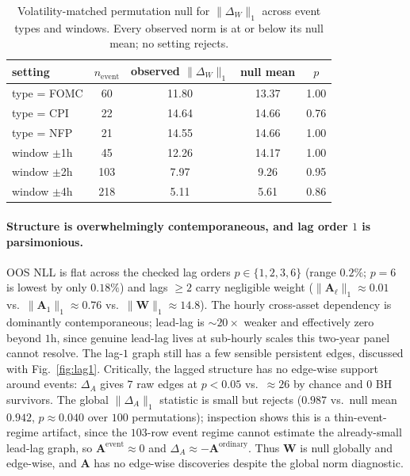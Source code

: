 \documentclass{article}
\newcommand{\W}{\bm{W}}
\newcommand{\A}{\bm{A}}
\newcommand{\Wd}{\Delta_{\!W}}
\newcommand{\Ad}{\Delta_{\!A}}
\begin{document}
\begin{table}[t]
\centering
\small
\begin{tabular}{lcccc}
\toprule
setting & $n_{\text{event}}$ & observed $\|\Wd\|_1$ & null mean & $p$\\
\midrule
type = FOMC   & 60  & 11.80 & 13.37 & 1.00\\
type = CPI    & 22  & 14.64 & 14.66 & 0.76\\
type = NFP    & 21  & 14.55 & 14.66 & 1.00\\
window $\pm$1h & 45  & 12.26 & 14.17 & 1.00\\
window $\pm$2h & 103 & \phantom{0}7.97 & \phantom{0}9.26 & 0.95\\
window $\pm$4h & 218 & \phantom{0}5.11 & \phantom{0}5.61 & 0.86\\
\bottomrule
\end{tabular}
\caption{Volatility-matched permutation null for $\|\Wd\|_1$ across event types and
windows. Every observed norm is at or below its null mean; no setting rejects.}
\label{tab:nulls}
\end{table}

\paragraph{Structure is overwhelmingly contemporaneous, and lag order $1$ is parsimonious.}
OOS NLL is flat across the checked lag orders $p\in\{1,2,3,6\}$ (range $0.2\%$; $p=6$
is lowest by only $0.18\%$) and lags $\ge 2$ carry negligible weight
($\|\A_\ell\|_1\approx 0.01$ vs.\ $\|\A_1\|_1\approx 0.76$
vs.\ $\|\W\|_1\approx 14.8$). The hourly cross-asset dependency is dominantly
contemporaneous; lead-lag is $\sim 20\times$ weaker and effectively zero beyond
$1$h, since genuine lead-lag lives at sub-hourly scales this two-year panel cannot
resolve. The lag-$1$ graph still has a few sensible persistent edges, discussed with
Fig.~\ref{fig:lag1}. Critically, the lagged structure has no edge-wise support around
events: $\Ad$ gives $7$ raw edges at $p<0.05$ vs.\ $\approx 26$ by chance and $0$ BH
survivors. The global $\|\Ad\|_1$ statistic is small but rejects
($0.987$ vs.\ null mean $0.942$, $p\approx0.040$ over $100$ permutations); inspection
shows this is a thin-event-regime artifact, since the $103$-row event regime cannot
estimate the already-small lead-lag graph, so $\A^{\text{event}}\approx 0$ and
$\Ad\approx-\A^{\text{ordinary}}$. Thus $\W$ is null globally and edge-wise, and $\A$
has no edge-wise discoveries despite the global norm diagnostic.
\end{document}

